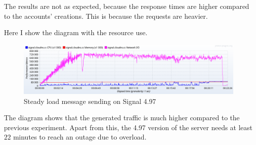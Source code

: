 \begin{table}[H]
\caption{Steady load message sending on Signal 4.97}
\label{tab:steadyloadmessage497}
\end{table}

The results are not as expected, because the response times are higher compared to the accounts' creations. This is because the requests are heavier.

Here I show the diagram with the resource use.

\begin{figure}[H]
    \centering
    \includegraphics[width=\textwidth]{images/497/4.97-steady-message}
    \caption{Steady load message sending on Signal 4.97}
    \label{fig:signalbasemessageloadold}
\end{figure}

The diagram shows that the generated traffic is much higher compared to the previous experiment. Apart from this, the 4.97 version of the server needs at least $22$ minutes to reach an outage due to overload.

